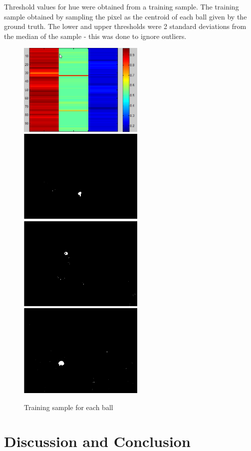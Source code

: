 \documentclass[10pt,a4paper,oneclumn]{article}
\begin{document}
Threshold values for hue were obtained from a training sample. The training sample obtained by sampling the pixel as the centroid of each ball given by the ground truth. The lower and upper thresholds were 2 standard deviations from the median of the sample - this was done to ignore outliers.

\begin{figure}
\centering
  \includegraphics[width=6cm]{figures/training.png}
  \includegraphics[width=6cm]{figures/class1.png}
  \includegraphics[width=6cm]{figures/class2.png}
  \includegraphics[width=6cm]{figures/class3.png}
\caption{Training sample for each ball}
\end{figure}


\section{Discussion and Conclusion}
\end{document}
